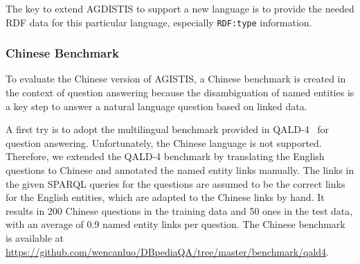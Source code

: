 The key to extend AGDISTIS to support a new language is to provide the needed \ac{RDF} data for this particular language, especially \texttt{\ac{RDF}:type} information. 




\subsubsection{Chinese Benchmark}

To evaluate the Chinese version of AGISTIS, a Chinese benchmark is created in the context of question answering because the disambiguation of named entities is a key step to answer a natural language question based on linked data. 

A first try is to adopt the multilingual benchmark provided in QALD-4~\cite{qald4} for question answering. Unfortunately, the Chinese language is not supported. Therefore, we extended the QALD-4 benchmark by translating the English questions to Chinese and annotated the named entity links manually. The links in the given SPARQL queries for the questions are assumed to be the correct links for the English entities, which are adapted to the Chinese links by hand. It results in 200 Chinese questions in the training data and 50 ones in the test data, with an average of 0.9 named entity links per question. The Chinese benchmark is available at \url{https://github.com/wencanluo/DBpediaQA/tree/master/benchmark/qald4}.

